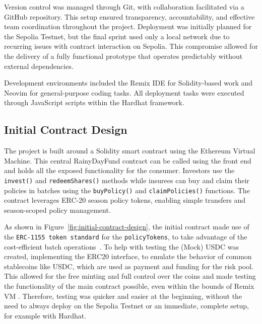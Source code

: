 \documentclass[11pt,a4paper]{article}
\begin{document}
        Version control was managed through Git, with collaboration facilitated via a GitHub repository.
        This setup ensured transparency, accountability, and effective team coordination throughout the project.
        Deployment was initially planned for the Sepolia Testnet\footnotemark{}, but the final sprint used only a local network due to recurring issues with contract interaction on Sepolia. 
        This compromise allowed for the delivery of a fully functional prototype that operates predictably without external dependencies.

        Development environments included the Remix IDE\footnotemark{} for Solidity-based work and Neovim for general-purpose coding tasks.
        All deployment tasks were executed through JavaScript scripts within the Hardhat framework.


        \subsection{Initial Contract Design}\label{subsec:initial-contract-design}
		The project is built around a Solidity smart contract using the Ethereum Virtual Machine.
		This central RainyDayFund contract can be called using the front end and holds all the exposed functionality for the consumer.
		Investors use the \texttt{invest()} and \texttt{redeemShares()} methods while insurees can buy and claim their policies in batches using the \texttt{buyPolicy()} and \texttt{claimPolicies()} functions.
		The contract leverages ERC-20 season policy tokens, enabling simple transfers and season-scoped policy management.

		As shown in Figure~\ref{fig:initial-contract-design}, the initial contract made use of the \texttt{ERC-1155 token standard} for the \texttt{policyTokens}, to take advantage of the cost-efficient batch operations~\parencite{ERC1155}.
		To help with testing the (Mock) USDC\footnotemark{} was created, implementing the ERC20 interface, to emulate the behavior of common stablecoins like USDC, which are used as payment and funding for the risk pool. 
        This allowed for the free minting and full control over the coins and made testing the functionality of the main contract possible, even within the bounds of Remix VM .
        Therefore, testing was quicker and easier at the beginning, without the need to always deploy on the Sepolia Testnet or an immediate, complete setup, for example with Hardhat.
\end{document}
